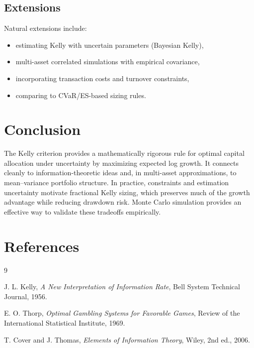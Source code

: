 \documentclass[11pt]{article}
\theoremstyle{plain}
\theoremstyle{definition}
\theoremstyle{remark}
\newcommand{\1}{\mathbf{1}}
\begin{document}
\subsection{Extensions}
Natural extensions include:
\begin{itemize}
\item estimating Kelly with uncertain parameters (Bayesian Kelly),
\item multi-asset correlated simulations with empirical covariance,
\item incorporating transaction costs and turnover constraints,
\item comparing to CVaR/ES-based sizing rules.
\end{itemize}

\section{Conclusion}
The Kelly criterion provides a mathematically rigorous rule for optimal capital allocation under uncertainty by maximizing expected log growth. It connects cleanly to information-theoretic ideas and, in multi-asset approximations, to mean--variance portfolio structure. In practice, constraints and estimation uncertainty motivate fractional Kelly sizing, which preserves much of the growth advantage while reducing drawdown risk. Monte Carlo simulation provides an effective way to validate these tradeoffs empirically.

\section*{References}

\begin{thebibliography}{9}

J. L. Kelly,
\emph{A New Interpretation of Information Rate},
Bell System Technical Journal, 1956.

E. O. Thorp,
\emph{Optimal Gambling Systems for Favorable Games},
Review of the International Statistical Institute, 1969.

T. Cover and J. Thomas,
\emph{Elements of Information Theory},
Wiley, 2nd ed., 2006.

\end{thebibliography}
\end{document}
